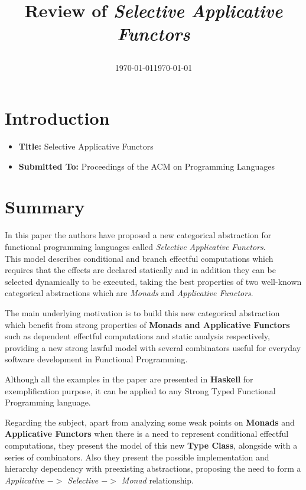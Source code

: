 \documentclass[12pt, a4paper]{article}
\title{
  Review of \textit{Selective Applicative Functors}\\
  \date\today\vspace{-2em}}
\date{\normalize\today}
\begin{document}
\maketitle

\section{Introduction}

\begin{itemize}
\item \textbf{Title:} Selective Applicative Functors
\item \textbf{Submitted To:} Proceedings of the ACM on Programming Languages
\end{itemize}

\section{Summary}
In this paper the authors have proposed a new categorical abstraction for
functional programming languages called \textit{Selective Applicative Functors}.\\
This model describes conditional and branch effectful computations which requires that the effects
are declared statically and in addition they can be selected dynamically to be executed, taking
the best properties of two well-known categorical abstractions which are \textit{Monads} and \textit{Applicative Functors}.

The main underlying motivation is to build this new categorical abstraction
which benefit from strong properties of \textbf{Monads and Applicative Functors} such as dependent
effectful computations and static analysis respectively, providing a new strong
lawful model with several combinators useful for everyday software development
in Functional Programming.

Although all the examples in the paper are presented in \textbf{Haskell} for exemplification purpose, it can be
applied to any Strong Typed Functional Programming language.

Regarding the subject, apart from analyzing some weak points on \textbf{Monads}
and \textbf{Applicative Functors} when there is a need to represent conditional
effectful computations, they present the model of this new \textbf{Type Class},
alongside with a series of combinators. Also they present the possible
implementation and hierarchy dependency with preexisting abstractions, proposing
the need to form a \textit{Applicative $->$ Selective $->$ Monad} relationship.
\end{document}
